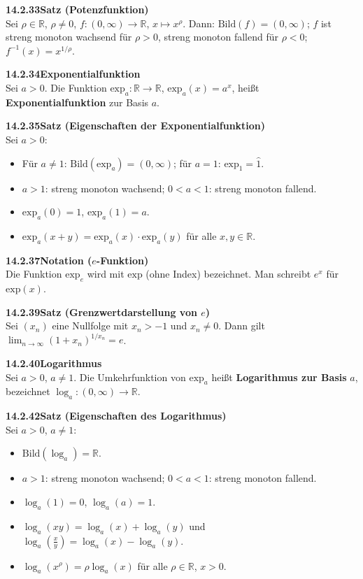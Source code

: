 \documentclass[a4paper,12pt]{article}
\newcommand{\gentry}[3]{%
  \noindent\textbf{#1\quad #2}\nopagebreak\\[0.2em]
  #3\par\smallskip
}
\begin{document}
\gentry{14.2.33}{Satz (Potenzfunktion)}{%
  Sei $\rho \in \mathbb{R}$, $\rho \neq 0$, $f: (0,\infty) \to \mathbb{R}$, $x \mapsto x^\rho$.
  Dann: $\mathrm{Bild}(f) = (0,\infty)$; $f$ ist streng monoton wachsend für $\rho > 0$,
  streng monoton fallend für $\rho < 0$; $f^{-1}(x) = x^{1/\rho}$.
}

\gentry{14.2.34}{Exponentialfunktion}{%
  Sei $a > 0$. Die Funktion $\mathrm{exp}_a: \mathbb{R} \to \mathbb{R}$,
  $\mathrm{exp}_a(x) = a^x$, heißt \textbf{Exponentialfunktion} zur Basis $a$.
}

\gentry{14.2.35}{Satz (Eigenschaften der Exponentialfunktion)}{%
  Sei $a > 0$:
  \begin{itemize}[topsep=2pt,itemsep=1pt]
    \item Für $a \neq 1$: $\mathrm{Bild}(\mathrm{exp}_a) = (0,\infty)$; für $a = 1$: $\mathrm{exp}_1 = \hat{1}$.
    \item $a > 1$: streng monoton wachsend; $0 < a < 1$: streng monoton fallend.
    \item $\mathrm{exp}_a(0) = 1$, $\mathrm{exp}_a(1) = a$.
    \item $\mathrm{exp}_a(x+y) = \mathrm{exp}_a(x) \cdot \mathrm{exp}_a(y)$ für alle $x, y \in \mathbb{R}$.
  \end{itemize}
}

\gentry{14.2.37}{Notation ($e$-Funktion)}{%
  Die Funktion $\mathrm{exp}_e$ wird mit $\mathrm{exp}$ (ohne Index) bezeichnet.
  Man schreibt $e^x$ für $\mathrm{exp}(x)$.
}

\gentry{14.2.39}{Satz (Grenzwertdarstellung von $e$)}{%
  Sei $(x_n)$ eine Nullfolge mit $x_n > -1$ und $x_n \neq 0$. Dann gilt
  $\displaystyle\lim_{n \to \infty} (1 + x_n)^{1/x_n} = e$.
}

\gentry{14.2.40}{Logarithmus}{%
  Sei $a > 0$, $a \neq 1$. Die Umkehrfunktion von $\mathrm{exp}_a$ heißt
  \textbf{Logarithmus zur Basis} $a$, bezeichnet $\log_a: (0,\infty) \to \mathbb{R}$.
}

\gentry{14.2.42}{Satz (Eigenschaften des Logarithmus)}{%
  Sei $a > 0$, $a \neq 1$:
  \begin{itemize}[topsep=2pt,itemsep=1pt]
    \item $\mathrm{Bild}(\log_a) = \mathbb{R}$.
    \item $a > 1$: streng monoton wachsend; $0 < a < 1$: streng monoton fallend.
    \item $\log_a(1) = 0$, $\log_a(a) = 1$.
    \item $\log_a(xy) = \log_a(x) + \log_a(y)$ und $\log_a\!\left(\frac{x}{y}\right) = \log_a(x) - \log_a(y)$.
    \item $\log_a(x^\rho) = \rho \log_a(x)$ für alle $\rho \in \mathbb{R}$, $x > 0$.
  \end{itemize}
}
\end{document}
